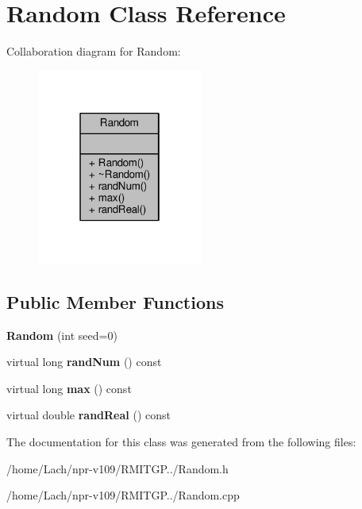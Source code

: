 \hypertarget{classRandom}{}\section{Random Class Reference}
\label{classRandom}


Collaboration diagram for Random\+:
\nopagebreak
\begin{figure}[H]
\begin{center}
\leavevmode
\includegraphics[width=154pt]{classRandom__coll__graph}
\end{center}
\end{figure}
\subsection*{Public Member Functions}
\begin{DoxyCompactItemize}
\item 
\hypertarget{classRandom_a6ed937af86218b90b14ca5bacf11b69b}{}\label{classRandom_a6ed937af86218b90b14ca5bacf11b69b} 
{\bfseries Random} (int seed=0)
\item 
\hypertarget{classRandom_acf5fc9ccf2687143402a7a34b1d1beb1}{}\label{classRandom_acf5fc9ccf2687143402a7a34b1d1beb1} 
virtual long {\bfseries rand\+Num} () const
\item 
\hypertarget{classRandom_af1b5f0f67b2739b74cf4c48f237cae8a}{}\label{classRandom_af1b5f0f67b2739b74cf4c48f237cae8a} 
virtual long {\bfseries max} () const
\item 
\hypertarget{classRandom_ac48a61d572a88ddf88a22f807374eb9d}{}\label{classRandom_ac48a61d572a88ddf88a22f807374eb9d} 
virtual double {\bfseries rand\+Real} () const
\end{DoxyCompactItemize}


The documentation for this class was generated from the following files\+:\begin{DoxyCompactItemize}
\item 
/home/\+Lach/npr-\/v109/\+R\+M\+I\+T\+G\+P../Random.\+h\item 
/home/\+Lach/npr-\/v109/\+R\+M\+I\+T\+G\+P../Random.\+cpp\end{DoxyCompactItemize}
